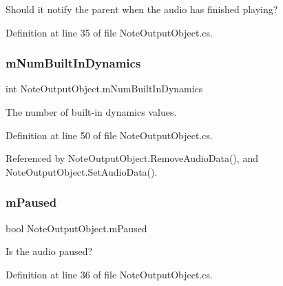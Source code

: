 Should it notify the parent when the audio has finished playing? 



Definition at line 35 of file Note\+Output\+Object.\+cs.

\mbox{\label{group___n_o_o_priv_var_ga3cc04564fcc1b1c4597af18e7e4fbc47}} 
\subsubsection{\texorpdfstring{m\+Num\+Built\+In\+Dynamics}{mNumBuiltInDynamics}}
{\footnotesize\ttfamily int Note\+Output\+Object.\+m\+Num\+Built\+In\+Dynamics\hspace{0.3cm}{\ttfamily [private]}}



The number of built-\/in dynamics values. 



Definition at line 50 of file Note\+Output\+Object.\+cs.



Referenced by Note\+Output\+Object.\+Remove\+Audio\+Data(), and Note\+Output\+Object.\+Set\+Audio\+Data().

\mbox{\label{group___n_o_o_priv_var_ga50fe6047e6a199215fc70b9fc78ac7eb}} 
\subsubsection{\texorpdfstring{m\+Paused}{mPaused}}
{\footnotesize\ttfamily bool Note\+Output\+Object.\+m\+Paused\hspace{0.3cm}{\ttfamily [private]}}



Is the audio paused? 



Definition at line 36 of file Note\+Output\+Object.\+cs.

\mbox{\label{group___n_o_o_priv_var_gafa20525b5515ab62d109f44ab45fba21}} 
